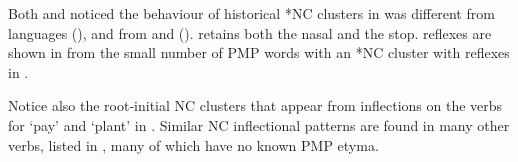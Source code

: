 Both \citet{Stresemann1927}
and \citet[133f]{Collins1986} noticed the behaviour of historical
*NC clusters in  was different from  languages
(\citeauthor{Stresemann1927}), and from  and  (\citeauthor{Collins1986}).
 retains both the nasal and the stop.
 reflexes are shown in  from the small number
of PMP words with an *NC cluster with reflexes in .


Notice also the root-initial NC clusters that appear from inflections
on the verbs for ‘pay’
and ‘plant’ in .
Similar NC inflectional patterns are found in many other verbs,
listed in , many of which have no known PMP etyma.


